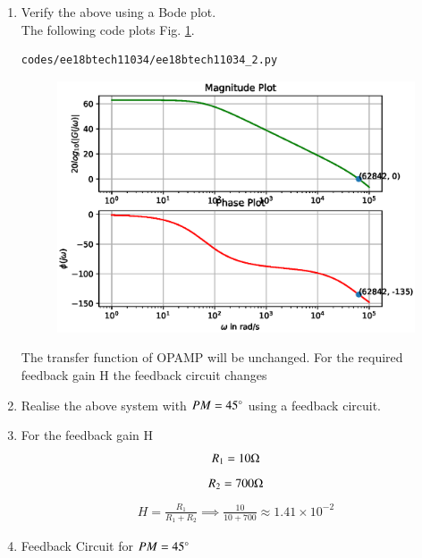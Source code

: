 \begin{enumerate}[label=\arabic*.,ref=\theenumi]
\item Verify the above using a Bode plot. 
\\
\solution 
The following code plots  Fig. \ref{fig:ee18btech11034_2}.
%
\begin{lstlisting}
codes/ee18btech11034/ee18btech11034_2.py
\end{lstlisting}
%
\begin{figure}[!h]
\centering
\includegraphics[width=\columnwidth]{./figs/ee18btech11034/ee18btech11034_2.eps}
\caption{}
\label{fig:ee18btech11034_2}
\end{figure}
The transfer function of OPAMP will be unchanged.
For the required feedback gain H the feedback circuit changes

\item Realise the above system with $PM = 45 \degree$ using a feedback circuit.\\
\solution
\begin{figure}[ht!]
	\begin{center}
		\resizebox{\columnwidth}{!}{}
	\end{center}
	\caption{}
	\label{fig:ee18btech11034_figd}
\end{figure}

\item For the feedback gain H\\
\solution
\begin{align}
    R_{1} = 10\ohm
\end{align}
\begin{align}
    R_{2} = 700\ohm
\end{align}
\begin{align}
    H = \frac{R_{1}}{R_{1}+R_{2}} 
    \implies \frac{10}{10+700} \approx 1.41 \times 10^{-2}
\end{align}

\item Feedback Circuit for $PM = 45\degree$\\
\solution
\begin{figure}[ht!]
	\begin{center}
		\resizebox{\columnwidth}{!}{}
	\end{center}
	\caption{}
	\label{fig:ee18btech11034_fige}
\end{figure}
\end{enumerate}
